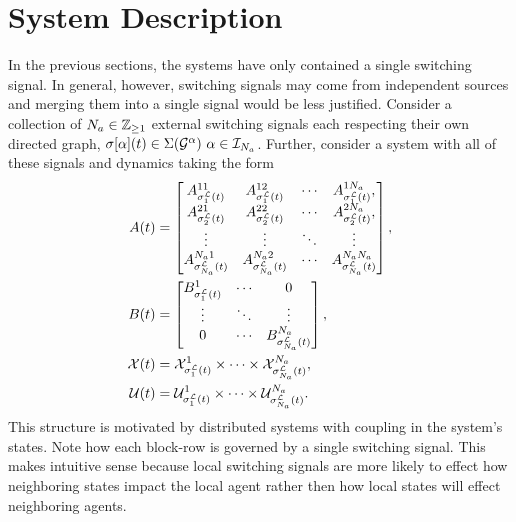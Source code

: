 
\section{System Description}
In the previous sections, the systems have only contained a single switching signal. In general, however, switching signals may come from independent sources and merging them into a single signal would be less justified. Consider a collection of ${N_a}\in\mathbb{Z}_{\geq 1}$ external switching signals each respecting their own directed graph, $\ss[\agentidx](t)\in\Sigma(\graph^\agentidx)\ \agentidx\in\idxset{\numagents}$. Further, consider a system with all of these signals and dynamics taking the form
\begin{subequations}
\label{eq:sys}
\begin{align}
A(t)&=\begin{bmatrix}
A^{11}_{\ssl[1](t)}&A^{12}_{\ssl[1](t)}&\cdots&A^{1\numagents}_{\ssl[1](t)},\\
A^{21}_{\ssl[2](t)}&A^{22}_{\ssl[2](t)}&\cdots&A^{2\numagents}_{\ssl[2](t)},\\
\vdots&\vdots & \ddots & \vdots\\
A^{\numagents 1}_{\ssl[\numagents](t)} & A^{\numagents 2}_{\ssl[\numagents](t)} &\cdots & A^{\numagents \numagents}_{\ssl[\numagents](t)} 
\end{bmatrix},\label{eq:sys_A}\\
B(t)&=\begin{bmatrix}
B^{1}_{\ssl[1](t)} & \cdots & 0\\
\vdots             & \ddots & \vdots\\
0                  & \cdots & B^{\numagents}_{\ssl[\numagents](t)}
\end{bmatrix},\label{eq:sys_B}\\
\xcon(t)&=\xcon[\ssl[1](t)]^1\times\cdots\times\xcon[\ssl[\numagents](t)]^\numagents,\label{eq:sys_X}\\
\ucon(t)&=\ucon[\ssl[1](t)]^1\times\cdots\times\ucon[\ssl[\numagents](t)]^\numagents\label{eq:sys_Y}.
\end{align}
\end{subequations}
This structure is motivated by distributed systems with coupling in the system's states. Note how each block-row is governed by a single switching signal. This makes intuitive sense because local switching signals are more likely to effect how neighboring states impact the local agent rather then how local states will effect neighboring agents.

